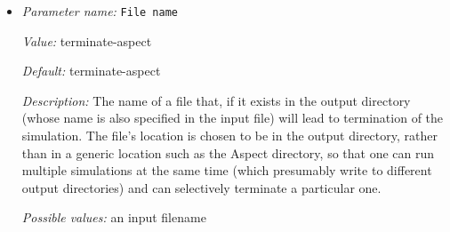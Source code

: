 \begin{itemize}
\item {\it Parameter name:} {\tt File name}
\label{parameters:Termination criteria/User request/File name}
\label{parameters:Termination_20criteria/User_20request/File_20name}


{\it Value:} terminate-aspect


{\it Default:} terminate-aspect


{\it Description:} The name of a file that, if it exists in the output directory (whose name is also specified in the input file) will lead to termination of the simulation. The file's location is chosen to be in the output directory, rather than in a generic location such as the Aspect directory, so that one can run multiple simulations at the same time (which presumably write to different output directories) and can selectively terminate a particular one.


{\it Possible values:} an input filename
\end{itemize}
